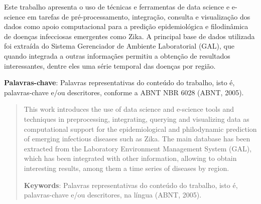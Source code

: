 \begin{resumo}

Este trabalho apresenta o uso de técnicas e ferramentas de data science e e-science em tarefas de pré-processamento, integração, consulta e visualização dos dados como apoio computacional para a predição epidemiológica e filodinâmica de doenças infecciosas emergentes como Zika. A principal base de dados utilizada foi extraída do Sistema Gerenciador de Ambiente Laboratorial (GAL), que quando integrada a outras informaçães permitiu a obtenção de resultados interessantes, dentre eles uma série temporal das doenças por região.

{\hspace{-8mm} \bf{Palavras-chave}}: Palavras representativas do conteúdo do trabalho, isto é, palavras-chave e/ou descritores, conforme a ABNT NBR 6028 (ABNT, 2005).

\end{resumo}

\begin{abstract}

This work introduces the use of data science and e-science tools and techniques in preprocessing, integrating, querying and visualizing data as computational support for the epidemiological and philodynamic prediction of emerging infectious diseases such as Zika. The main database has been extracted from the Laboratory Environment Management System (GAL), which has been integrated with other information, allowing to obtain interesting results, among them a time series of diseases by region.

{\hspace{-8mm} \bf{Keywords}}: Palavras representativas do conteúdo do trabalho, isto é, palavras-chave e/ou descritores, na língua (ABNT, 2005).

\end{abstract}

\listoffigures


\cleardoublepage
\listoftables
\cleardoublepage

